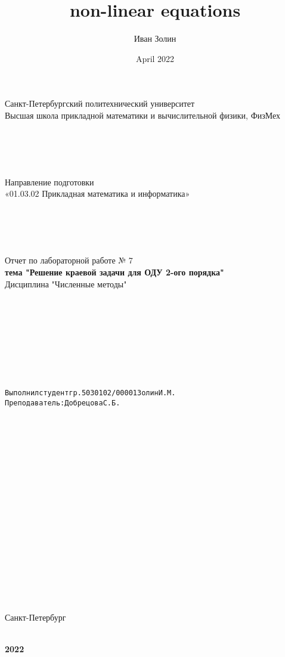 \documentclass{article}
\title{non-linear equations}
\author{Иван Золин}
\date{April 2022}
\begin{document}
	
	\large
	\begin{center}
		
		Санкт-Петербургский политехнический университет\\
		Высшая школа прикладной математики и вычислительной физики, ФизМех
		
		~\\
		~\\
		~\\
		~\\
		Направление подготовки\\
		«01.03.02 Прикладная математика и информатика»
		
		~\\
		~\\
		~\\
		~\\
		Отчет по лабораторной работе № 7\\
		\textbf{тема "Решение краевой задачи для ОДУ 2-ого порядка" }	
		~\\	Дисциплина "Численные методы"
	\end{center}
	
	~\\
	~\\
	~\\
	~\\
	~\\
	~\\
	~\\
	\begin{alltt}
		\begin{center}
			Выполнил студент гр. 5030102/00001			  		   		  Золин И.М.
			Преподаватель: 				              	        	Добрецова С.Б.
		\end{center}
		
	\end{alltt}
	
	~\\
	~\\
	~\\
	~\\
	~\\
	~\\
	~\\
	~\\
	~\\
	~\\
	~\\
	~\\
	~\\
	~\\
	~\\
	~\\
	\begin{center}
		Санкт-Петербург
		
		~\\
		\textbf{2022}
		
	\end{center}{}
	
\end{document}
